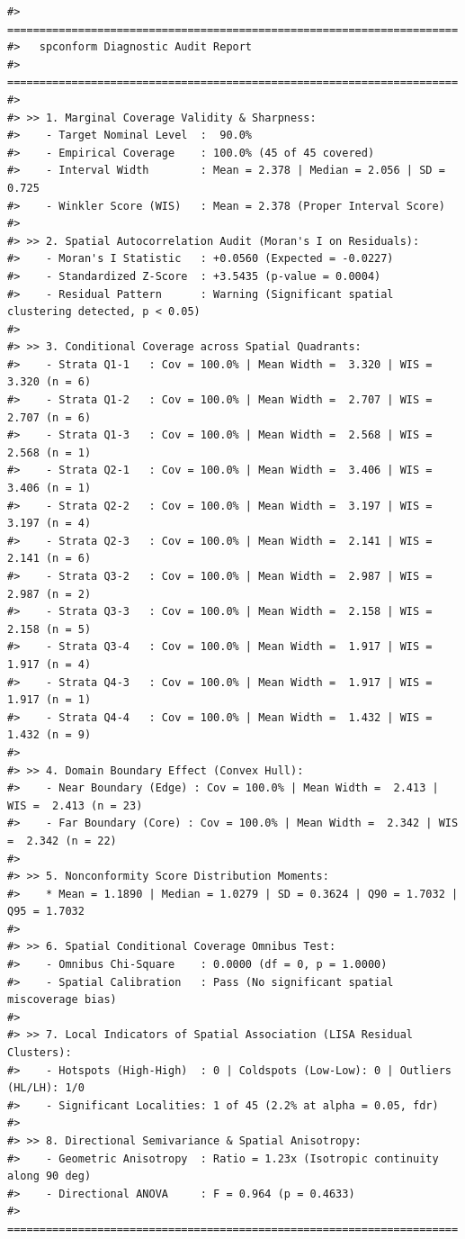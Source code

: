 \begin{verbatim}
#> ======================================================================
#>   spconform Diagnostic Audit Report
#> ======================================================================
#> 
#> >> 1. Marginal Coverage Validity & Sharpness:
#>    - Target Nominal Level  :  90.0%
#>    - Empirical Coverage    : 100.0% (45 of 45 covered)
#>    - Interval Width        : Mean = 2.378 | Median = 2.056 | SD = 0.725
#>    - Winkler Score (WIS)   : Mean = 2.378 (Proper Interval Score)
#> 
#> >> 2. Spatial Autocorrelation Audit (Moran's I on Residuals):
#>    - Moran's I Statistic   : +0.0560 (Expected = -0.0227)
#>    - Standardized Z-Score  : +3.5435 (p-value = 0.0004)
#>    - Residual Pattern      : Warning (Significant spatial clustering detected, p < 0.05)
#> 
#> >> 3. Conditional Coverage across Spatial Quadrants:
#>    - Strata Q1-1   : Cov = 100.0% | Mean Width =  3.320 | WIS =  3.320 (n = 6)
#>    - Strata Q1-2   : Cov = 100.0% | Mean Width =  2.707 | WIS =  2.707 (n = 6)
#>    - Strata Q1-3   : Cov = 100.0% | Mean Width =  2.568 | WIS =  2.568 (n = 1)
#>    - Strata Q2-1   : Cov = 100.0% | Mean Width =  3.406 | WIS =  3.406 (n = 1)
#>    - Strata Q2-2   : Cov = 100.0% | Mean Width =  3.197 | WIS =  3.197 (n = 4)
#>    - Strata Q2-3   : Cov = 100.0% | Mean Width =  2.141 | WIS =  2.141 (n = 6)
#>    - Strata Q3-2   : Cov = 100.0% | Mean Width =  2.987 | WIS =  2.987 (n = 2)
#>    - Strata Q3-3   : Cov = 100.0% | Mean Width =  2.158 | WIS =  2.158 (n = 5)
#>    - Strata Q3-4   : Cov = 100.0% | Mean Width =  1.917 | WIS =  1.917 (n = 4)
#>    - Strata Q4-3   : Cov = 100.0% | Mean Width =  1.917 | WIS =  1.917 (n = 1)
#>    - Strata Q4-4   : Cov = 100.0% | Mean Width =  1.432 | WIS =  1.432 (n = 9)
#> 
#> >> 4. Domain Boundary Effect (Convex Hull):
#>    - Near Boundary (Edge) : Cov = 100.0% | Mean Width =  2.413 | WIS =  2.413 (n = 23)
#>    - Far Boundary (Core) : Cov = 100.0% | Mean Width =  2.342 | WIS =  2.342 (n = 22)
#> 
#> >> 5. Nonconformity Score Distribution Moments:
#>    * Mean = 1.1890 | Median = 1.0279 | SD = 0.3624 | Q90 = 1.7032 | Q95 = 1.7032
#> 
#> >> 6. Spatial Conditional Coverage Omnibus Test:
#>    - Omnibus Chi-Square    : 0.0000 (df = 0, p = 1.0000)
#>    - Spatial Calibration   : Pass (No significant spatial miscoverage bias)
#> 
#> >> 7. Local Indicators of Spatial Association (LISA Residual Clusters):
#>    - Hotspots (High-High)  : 0 | Coldspots (Low-Low): 0 | Outliers (HL/LH): 1/0
#>    - Significant Localities: 1 of 45 (2.2% at alpha = 0.05, fdr)
#> 
#> >> 8. Directional Semivariance & Spatial Anisotropy:
#>    - Geometric Anisotropy  : Ratio = 1.23x (Isotropic continuity along 90 deg)
#>    - Directional ANOVA     : F = 0.964 (p = 0.4633)
#> ======================================================================
\end{verbatim}

